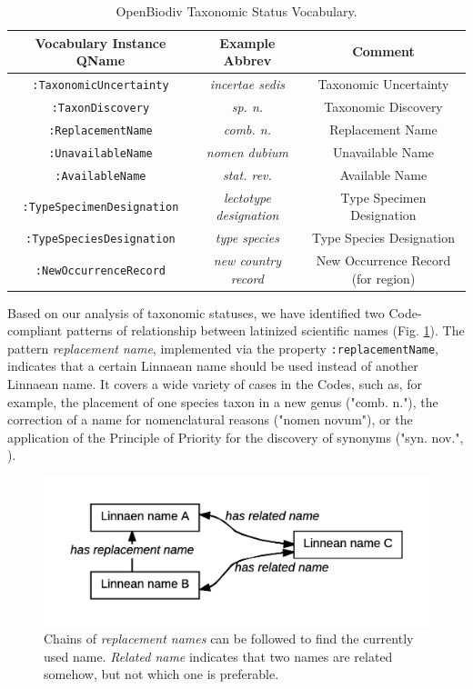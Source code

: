 \begin{table}[h!]
\caption{OpenBiodiv Taxonomic Status Vocabulary.}
\begin{tabular}{ccc}
\hline
Vocabulary Instance QName & Example Abbrev & Comment\\ \hline
{\tt :TaxonomicUncertainty} & \emph{incertae sedis} & Taxonomic Uncertainty\\
{\tt :TaxonDiscovery} & \emph{sp. n.} & Taxonomic Discovery \\
{\tt :ReplacementName} & \emph{comb. n.} & Replacement Name \\
{\tt :UnavailableName} & \emph{nomen dubium} &  Unavailable Name \\
{\tt :AvailableName} & \emph{stat. rev.} & Available Name \\
{\tt :TypeSpecimenDesignation} & \emph{lectotype designation} & Type Specimen Designation \\
{\tt :TypeSpeciesDesignation} & \emph{type species} & Type Species Designation\\
{\tt :NewOccurrenceRecord} & \emph{new country record} & New Occurrence Record (for region)\\
\hline
\end{tabular}
\label{taxonomic-status-vocabulary}
\end{table}

Based on our analysis of taxonomic statuses, we have identified two Code-compliant patterns of relationship between latinized scientific names (Fig. \ref{scientific-name-patterns}). The pattern \emph{replacement name}, implemented via the property {\tt :replacementName}, indicates that a certain Linnaean name should be used instead of another Linnaean name. It covers a wide variety of cases in the Codes, such as, for example, the placement of one species taxon in a new genus ("comb. n."), the correction of a name for nomenclatural reasons ("nomen novum"), or the application of the Principle of Priority for the discovery of synonyms ("syn. nov.", \cite{international_commission_on_zoological_nomenclature_official_2017}).

\begin{figure}[h!]
 \centering
  \includegraphics[width=\textwidth]{Figures/scientific-name-patterns}
  \decoRule
  \caption[Scientific name patterns diagram.]{
  Chains of \emph{replacement names} can be followed to find the currently used name. \emph{Related name} indicates that two names are related somehow, but not which one is preferable.}
  \label{scientific-name-patterns}
\end{figure}

